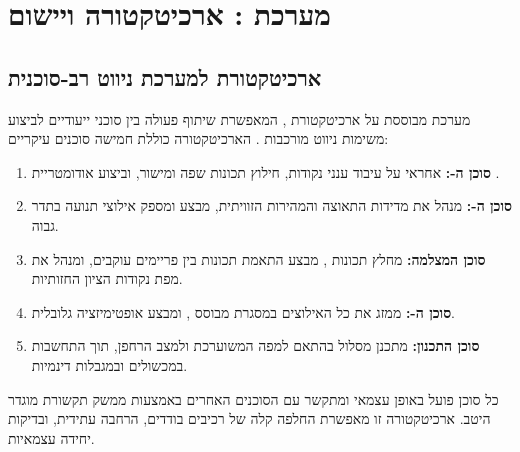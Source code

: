 

\section{מערכת : ארכיטקטורה ויישום}
\label{sec:conclusion}

\subsection{ארכיטקטורת  למערכת ניווט רב-סוכנית}
\label{subsec:crewai_arch}

מערכת  מבוססת על ארכיטקטורת ,
המאפשרת שיתוף פעולה בין סוכני  ייעודיים לביצוע משימות
ניווט מורכבות \cite{CrewAIDocs}. הארכיטקטורה כוללת חמישה סוכנים
עיקריים:

\begin{enumerate}
    \item \textbf{סוכן ה-:} אחראי על עיבוד ענני נקודות,
    חילוץ תכונות שפה ומישור, וביצוע אודומטריית .
    \item \textbf{סוכן ה-:} מנהל את מדידות התאוצה והמהירות
    הזוויתית, מבצע  ומספק אילוצי תנועה
    בתדר גבוה.
    \item \textbf{סוכן המצלמה:} מחלץ תכונות , מבצע
    התאמת תכונות בין פריימים עוקבים, ומנהל את מפת נקודות הציון
    החזותיות.
    \item \textbf{סוכן ה-:} ממזג את כל האילוצים
    במסגרת  מבוסס , ומבצע
    אופטימיזציה גלובלית.
    \item \textbf{סוכן התכנון:} מתכנן מסלול בהתאם למפה המשוערכת
    ולמצב הרחפן, תוך התחשבות במכשולים ובמגבלות דינמיות.
\end{enumerate}

כל סוכן פועל באופן עצמאי ומתקשר עם הסוכנים האחרים באמצעות
ממשק תקשורת מוגדר היטב. ארכיטקטורה זו מאפשרת החלפה קלה של
רכיבים בודדים, הרחבה עתידית, ובדיקות יחידה עצמאיות.

